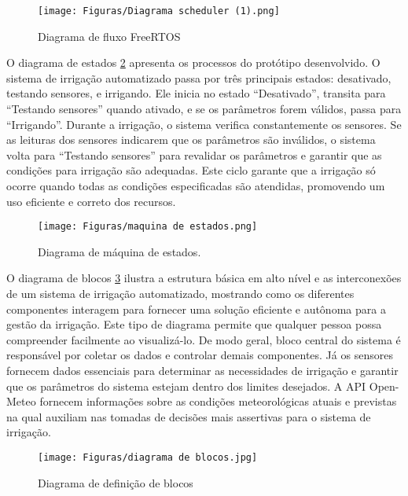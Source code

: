 \documentclass[%
  article,%
  a4paper,%
  12pt,%
  fleqn,%
  oneside,%
  chapter = TITLE,%
  section = TITLE,%
]{abntex2}
\begin{document}
\begin{figure}[!ht]
    \centering
    \caption{Diagrama de fluxo FreeRTOS }
    \texttt{[image: Figuras/Diagrama scheduler (1).png]}
    \label{fig:diagfirm}
\end{figure}
  
  O diagrama de estados \cref{fig:maquinaestados} apresenta os processos do protótipo desenvolvido. O sistema de irrigação automatizado passa por três principais estados: desativado, testando sensores, e irrigando. Ele inicia no estado “Desativado”, transita para “Testando sensores” quando ativado, e se os parâmetros forem válidos, passa para “Irrigando”. Durante a irrigação, o sistema verifica constantemente os sensores. Se as leituras dos sensores indicarem que os parâmetros são inválidos, o sistema volta para “Testando sensores” para revalidar os parâmetros e garantir que as condições para irrigação são adequadas. Este ciclo garante que a irrigação só ocorre quando todas as condições especificadas são atendidas, promovendo um uso eficiente e correto dos recursos.

  
\begin{figure}[!htb]
    \caption{Diagrama de máquina de estados.}
    \centering
    \texttt{[image: Figuras/maquina de estados.png]}
    \label{fig:maquinaestados}
\end{figure}

O diagrama de blocos \cref{fig:diagramblok} ilustra a estrutura básica em alto nível e as interconexões de um sistema de irrigação automatizado, mostrando como os diferentes componentes interagem para fornecer uma solução eficiente e autônoma para a gestão da irrigação. Este tipo de diagrama permite que qualquer pessoa possa compreender facilmente ao visualizá-lo. De modo geral, bloco central do sistema é responsável por coletar os dados e controlar demais componentes. Já os sensores fornecem dados essenciais para determinar as necessidades de irrigação e garantir que os parâmetros do sistema estejam dentro dos limites desejados. A API Open-Meteo fornecem informações sobre as condições meteorológicas atuais e previstas na qual auxiliam nas tomadas de decisões mais assertivas para o sistema de irrigação.

\begin{figure}[h]
    \centering
    \caption{Diagrama de definição de blocos}
    \texttt{[image: Figuras/diagrama de blocos.jpg]}
    \label{fig:diagramblok}
\end{figure}
\end{document}
